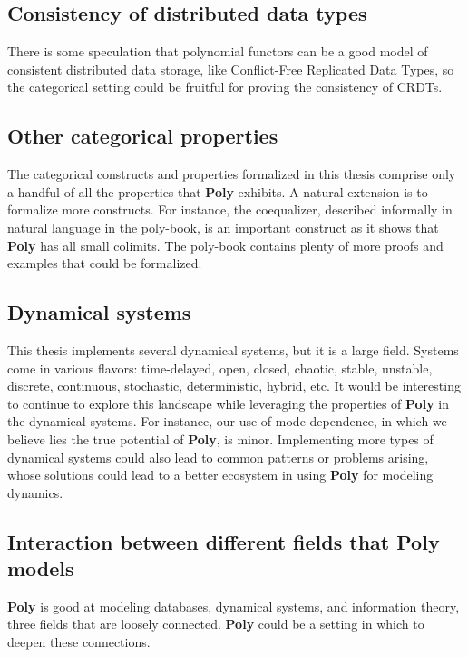 \subsection{Consistency of distributed data types}

There is some speculation that polynomial functors can be a good model of consistent distributed data storage, like Conflict-Free Replicated Data Types, so the categorical setting could be fruitful for proving the consistency of CRDTs.

\subsection{Other categorical properties}
The categorical constructs and properties formalized in this thesis comprise only a handful of all the properties that \textbf{Poly} exhibits. A natural extension is to formalize more constructs. For instance, the coequalizer, described informally in natural language in the poly-book, is an important construct as it shows that \textbf{Poly} has all small colimits. The poly-book contains plenty of more proofs and examples that could be formalized. 

\subsection{Dynamical systems}
This thesis implements several dynamical systems, but it is a large field. Systems come in various flavors: time-delayed, open, closed, chaotic, stable, unstable, discrete, continuous, stochastic, deterministic, hybrid, etc. It would be interesting to continue to explore this landscape while leveraging the properties of \textbf{Poly} in the dynamical systems. For instance, our use of mode-dependence, in which we believe lies the true potential of \textbf{Poly}, is minor. Implementing more types of dynamical systems could also lead to common patterns or problems arising, whose solutions could lead to a better ecosystem in using \textbf{Poly} for modeling dynamics.

\subsection{Interaction between different fields that Poly models}

\textbf{Poly} is good at modeling databases, dynamical systems, and information theory, three fields that are loosely connected. \textbf{Poly} could be a setting in which to deepen these connections.

